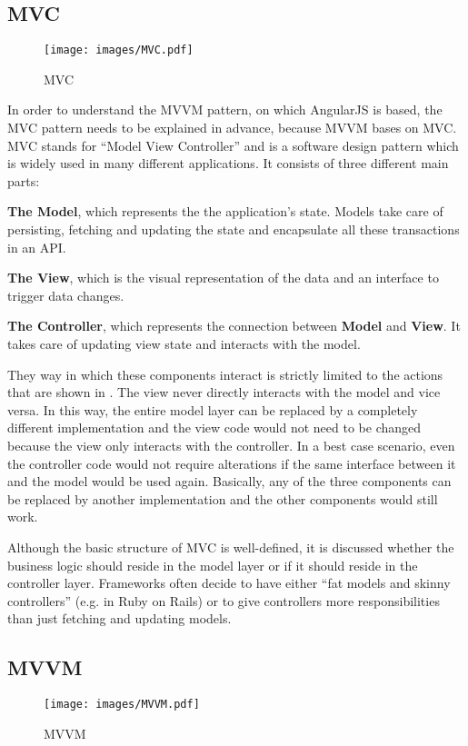\subsection{MVC}
\label{subsec:mvc}

\begin{figure}[htb]
  \centerline{\texttt{[image: images/MVC.pdf]}}
  \caption[MVC]{MVC}
  \label{fig:mvc}
\end{figure}

In order to understand the MVVM pattern, on which AngularJS is based, the MVC pattern needs to be explained in advance, because MVVM bases on MVC. MVC stands for ``Model View Controller'' and is a software design pattern which is widely used in many different applications. It consists of three different main parts:

\textbf{The Model}, which represents the the application's state. Models take care of persisting, fetching and updating the state and encapsulate all these transactions in an API.

\textbf{The View}, which is the visual representation of the data and an interface to trigger data changes.

\textbf{The Controller}, which represents the connection between \textbf{Model} and \textbf{View}. It takes care of updating view state and interacts with the model.

They way in which these components interact is strictly limited to the actions that are shown in . The view never directly interacts with the model and vice versa. In this way, the entire model layer can be replaced by a completely different implementation and the view code would not need to be changed because the view only interacts with the controller. In a best case scenario, even the controller code would not require alterations if the same interface between it and the model would be used again. Basically, any of the three components can be replaced by another implementation and the other components would still work.

Although the basic structure of MVC is well-defined, it is discussed whether the business logic should reside in the model layer or if it should reside in the controller layer. Frameworks often decide to have either ``fat models and skinny controllers'' (e.g. in Ruby on Rails) or to give controllers more responsibilities than just fetching and updating models.

\subsection{MVVM}
\label{subsec:mvvm}

\begin{figure}[htb]
  \centerline{\texttt{[image: images/MVVM.pdf]}}
  \caption[MVVM]{MVVM}
  \label{fig:mvc}
\end{figure}